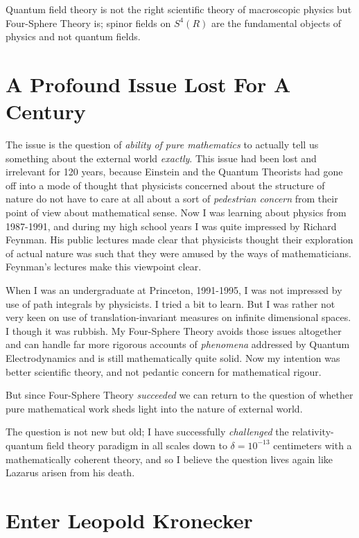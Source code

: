 \documentclass{amsart}
\begin{document}
Quantum field theory is not the right scientific theory of macroscopic physics but Four-Sphere Theory is; spinor fields on $S^4(R)$ are the fundamental objects of physics and not quantum fields.

  

\section{A Profound Issue Lost For A Century}

The issue is the question of {\em ability of pure mathematics} to actually tell us something about the external world {\em exactly}.  This issue had been lost and irrelevant for 120 years, because Einstein and the Quantum Theorists had gone off into a mode of thought that physicists concerned about the structure of nature do not have to care at all about a sort of {\em pedestrian concern} from their point of view about mathematical sense.  Now I was learning about physics from 1987-1991, and during my high school years I was quite impressed by Richard Feynman.  His public lectures made clear that physicists thought their exploration of actual nature was such that they were amused by the ways of mathematicians.  Feynman's lectures make this viewpoint clear.

When I was an undergraduate at Princeton, 1991-1995, I was not impressed by use of path integrals by physicists.  I tried a bit to learn.  But I was rather not very keen on use of translation-invariant measures on infinite dimensional spaces.  I though it was rubbish.  My Four-Sphere Theory avoids those issues altogether and can handle far more rigorous accounts of {\em phenomena} addressed by Quantum Electrodynamics and is still mathematically quite solid.  Now my intention was better scientific theory, and not pedantic concern for mathematical rigour.

But since Four-Sphere Theory {\em succeeded} we can return to the question of whether pure mathematical work sheds light into the nature of external world.

The question is not new but old; I have successfully {\em challenged} the relativity-quantum field theory paradigm in all scales down to $\delta=10^{-13}$ centimeters with a mathematically coherent theory, and so I believe the question lives again like Lazarus arisen from his death.

\section{Enter Leopold Kronecker}
\end{document}
